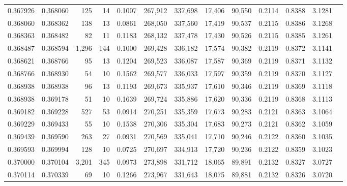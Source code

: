 \begin{tabular}{rrrrrrrrrrrrr}
0.367926 & 0.368060 &   125 &  14 &                                     0.1007 & 267,912 & 337,698 &  17,406 &  90,550 & 0.2114 & 0.8388 & 3.1281 \\
0.368060 & 0.368362 &   138 &  13 &                                     0.0861 & 268,050 & 337,560 &  17,419 &  90,537 & 0.2115 & 0.8386 & 3.1268 \\
0.368363 & 0.368482 &    82 &  11 &                                     0.1183 & 268,132 & 337,478 &  17,430 &  90,526 & 0.2115 & 0.8385 & 3.1261 \\
0.368487 & 0.368594 & 1,296 & 144 &                                     0.1000 & 269,428 & 336,182 &  17,574 &  90,382 & 0.2119 & 0.8372 & 3.1141 \\
0.368621 & 0.368766 &    95 &  13 &                                     0.1204 & 269,523 & 336,087 &  17,587 &  90,369 & 0.2119 & 0.8371 & 3.1132 \\
0.368766 & 0.368930 &    54 &  10 &                                     0.1562 & 269,577 & 336,033 &  17,597 &  90,359 & 0.2119 & 0.8370 & 3.1127 \\
0.368938 & 0.368938 &    96 &  13 &                                     0.1193 & 269,673 & 335,937 &  17,610 &  90,346 & 0.2119 & 0.8369 & 3.1118 \\
0.368938 & 0.369178 &    51 &  10 &                                     0.1639 & 269,724 & 335,886 &  17,620 &  90,336 & 0.2119 & 0.8368 & 3.1113 \\
0.369182 & 0.369228 &   527 &  53 &                                     0.0914 & 270,251 & 335,359 &  17,673 &  90,283 & 0.2121 & 0.8363 & 3.1064 \\
0.369229 & 0.369433 &    55 &  10 &                                     0.1538 & 270,306 & 335,304 &  17,683 &  90,273 & 0.2121 & 0.8362 & 3.1059 \\
0.369439 & 0.369590 &   263 &  27 &                                     0.0931 & 270,569 & 335,041 &  17,710 &  90,246 & 0.2122 & 0.8360 & 3.1035 \\
0.369593 & 0.369994 &   128 &  10 &                                     0.0725 & 270,697 & 334,913 &  17,720 &  90,236 & 0.2122 & 0.8359 & 3.1023 \\
0.370000 & 0.370104 & 3,201 & 345 &                                     0.0973 & 273,898 & 331,712 &  18,065 &  89,891 & 0.2132 & 0.8327 & 3.0727 \\
0.370114 & 0.370339 &    69 &  10 &                                     0.1266 & 273,967 & 331,643 &  18,075 &  89,881 & 0.2132 & 0.8326 & 3.0720 \\

\end{tabular}

